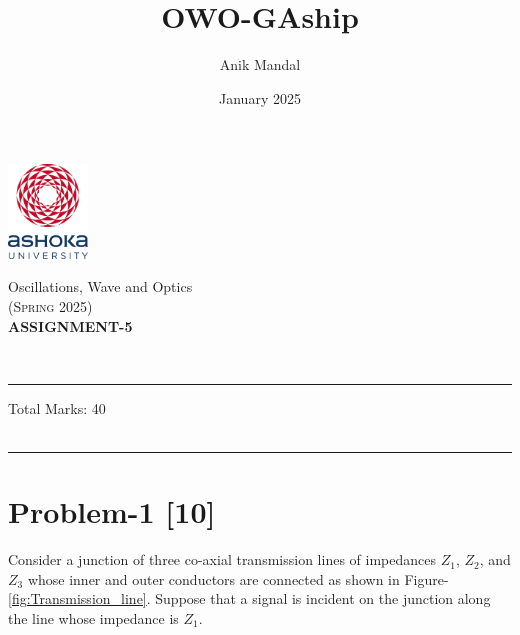 \documentclass[12pt, a4paper]{article}
\title{OWO-GAship}
\author{Anik Mandal}
\date{January 2025}
\begin{document}
\begin{minipage}[t][][c]{0.1\textwidth}
    \begin{flushleft}
        \includegraphics[height=2.5cm]{tex-resources/Ashoka Logo.png}
    \end{flushleft}
\end{minipage}
\begin{minipage}[t][][c]{0.85\textwidth}
    \begin{center}
        {\LARGE Oscillations, Wave and Optics}\\ \vspace{0.5em}
        \textsc{(Spring 2025)}\\
        \vspace{1em}
        \textbf{\Large ASSIGNMENT-5} \\
    \end{center}
\end{minipage}
\vspace{10pt}\\
\rule[0em]{\textwidth}{0.75pt}

\hfill 
Total Marks: 40   \\
\hfill
{}\\
\vspace{.2cm}
\rule[0em]{\textwidth}{1.75pt}
\vspace{-1cm}
\justifying

\section*{Problem-1 \hfill \textbf{[10]}}
Consider a junction of three co-axial transmission lines of impedances $Z_1$, $Z_2$, and $Z_3$ whose 
inner and outer conductors are connected as shown in Figure-\ref{fig:Transmission_line}. Suppose that 
a signal is incident on the junction along the line whose impedance is $Z_1$.
\end{document}
